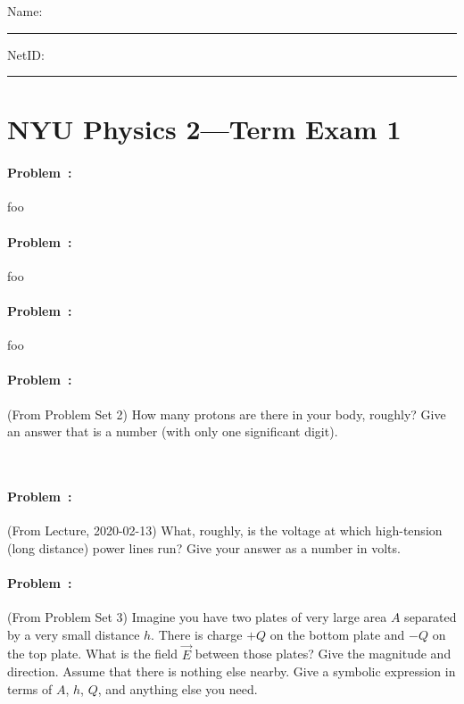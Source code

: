 \documentclass[12pt]{article}
\begin{document}
\noindent
Name: \rule[-1ex]{0.55\textwidth}{0.1pt}
NetID: \rule[-1ex]{0.2\textwidth}{0.1pt}

\section*{NYU Physics 2---Term Exam 1}

\paragraph{Problem~\theproblem:}%
foo

\vfill
\paragraph{Problem~\theproblem:}%
foo

\vfill
\paragraph{Problem~\theproblem:}%
foo

\vfill
\paragraph{Problem~\theproblem:}%
(From Problem Set 2)
How many protons are there in your body, roughly?
Give an answer that is a number (with only one significant digit).

\vfill ~
\clearpage

\paragraph{Problem~\theproblem:}%
(From Lecture, 2020-02-13)
What, roughly, is the voltage at which high-tension (long distance) power lines run?
Give your answer as a number in volts.

\vfill
\paragraph{Problem~\theproblem:}%
(From Problem Set 3)
Imagine you have two plates of very large area $A$ separated by a very small distance $h$.
There is charge $+Q$ on the bottom plate and $-Q$ on the top plate.
What is the field $\vec{E}$ between those plates? Give the magnitude and direction.
Assume that there is nothing else nearby.
Give a symbolic expression in terms of $A$, $h$, $Q$, and anything else you need.
\end{document}
